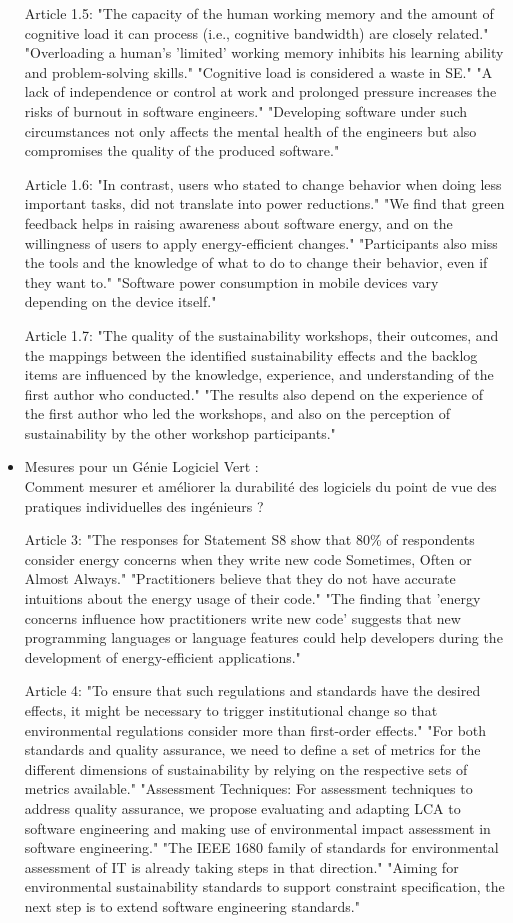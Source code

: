 \begin{itemize}
Article 1.5:
"The capacity of the human working memory and the amount of cognitive load it can process (i.e., cognitive bandwidth) are closely related." 
"Overloading a human’s 'limited' working memory inhibits his learning ability and problem-solving skills." 
"Cognitive load is considered a waste in SE." 
"A lack of independence or control at work and prolonged pressure increases the risks of burnout in software engineers." 
"Developing software under such circumstances not only affects the mental health of the engineers but also compromises the quality of the produced software."

Article 1.6:
"In contrast, users who stated to change behavior when doing less important tasks, did not translate into power reductions." 
"We find that green feedback helps in raising awareness about software energy, and on the willingness of users to apply energy-efficient changes." 
"Participants also miss the tools and the knowledge of what to do to change their behavior, even if they want to." 
"Software power consumption in mobile devices vary depending on the device itself."

Article 1.7:
"The quality of the sustainability workshops, their outcomes, and the mappings between the identified sustainability effects and the backlog items are influenced by the knowledge, experience, and understanding of the first author who conducted." 
"The results also depend on the experience of the first author who led the workshops, and also on the perception of sustainability by the other workshop participants."  

    \item Mesures pour un Génie Logiciel Vert : \\
    Comment mesurer et améliorer la durabilité des logiciels du point de vue des pratiques individuelles des ingénieurs ?

Article 3:
"The responses for Statement S8 show that 80\% of respondents consider energy concerns when they write new code Sometimes, Often or Almost Always."
"Practitioners believe that they do not have accurate intuitions about the energy usage of their code."
"The finding that 'energy concerns influence how practitioners write new code' suggests that new programming languages or language features could help developers during the development of energy-efficient applications."

Article 4:
"To ensure that such regulations and standards have the desired effects, it might be necessary to trigger institutional change so that environmental regulations consider more than first-order effects."
"For both standards and quality assurance, we need to define a set of metrics for the different dimensions of sustainability by relying on the respective sets of metrics available."
"Assessment Techniques: For assessment techniques to address quality assurance, we propose evaluating and adapting LCA to software engineering and making use of environmental impact assessment in software engineering."
"The IEEE 1680 family of standards for environmental assessment of IT is already taking steps in that direction."
"Aiming for environmental sustainability standards to support constraint specification, the next step is to extend software engineering standards."


\end{itemize}
